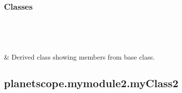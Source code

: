 \documentclass[letterpaper,10pt,english]{sphinxmanual}
\begin{document}
\subsubsection*{Classes}


\begin{savenotes}\sphinxatlongtablestart\begin{longtable}[c]{}
\hline

\endfirsthead

%
{}\\
\hline

\endhead

\hline
{}\\
\endfoot

\endlastfoot

\sphinxAtStartPar
{\hyperref[\detokenize{_autosummary/planetscope.mymodule2.myClass2:planetscope.mymodule2.myClass2}]{}}
&
\sphinxAtStartPar
Derived class showing members from base class.
\\
\hline
\end{longtable}\sphinxatlongtableend\end{savenotes}


\subsection{planetscope.mymodule2.myClass2}
\label{\detokenize{_autosummary/planetscope.mymodule2.myClass2:planetscope-mymodule2-myclass2}}\label{\detokenize{_autosummary/planetscope.mymodule2.myClass2::doc}}
\end{document}
